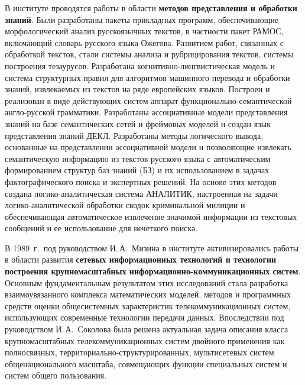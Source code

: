 \begin{multicols}{2}
     В институте проводятся работы в области \textbf{методов
представления и обработки знаний}. Были разработаны пакеты
прикладных программ, обеспечивающие морфологический анализ
русскоязычных текстов, в частности пакет РАМОС, включающий
словарь русского языка Ожегова. Развитием работ, связанных с
обработкой текстов, стали сис\-те\-мы анализа и рубрицирования
текстов, системы построения тезаурусов. Разработана
     ког\-ни\-тив\-но-линг\-ви\-сти\-че\-ская модель и система структурных
правил для алгоритмов машинного перевода и обработки знаний,
извлекаемых из текстов на ряде европейских языков. Построен и
реализован в виде действующих систем аппарат функ\-цио\-наль\-но-се\-ман\-ти\-че\-ской 
анг\-ло-рус\-ской грамматики. Разработаны
ассоциативные модели представления знаний на базе семантических
сетей и фреймовых моделей и создан язык представления знаний
ДЕКЛ. Разработаны методы логического вывода, основанные на
представлении ассоциативной модели и позволяющие извлекать
семантическую информацию из текстов русского языка с
автоматическим формированием структур баз знаний (БЗ) и их использованием в
задачах фактографического поиска и экспертных решений. На
основе этих методов создана ло\-ги\-ко-ана\-ли\-ти\-че\-ская система
\mbox{АНАЛИТИК}, настроенная на задачи ло\-ги\-ко-ана\-ли\-ти\-че\-ской
обработки сводок криминальной милиции и обеспечивающая
автоматическое извлечение значимой информации из текстовых
сообщений и ее использование для нечеткого поиска.
{

}

     В 1989~г.\ под руководством И.\,А.~Мизина в %
инсти\-ту\-те
активизировались работы в области %
разви\-тия \textbf{сетевых
информационных технологий и технологии построения
крупномасштабных ин\-фор\-ма\-ци\-он\-но-ком\-му\-ни\-ка\-ци\-он\-ных
систем}. Основным фундаментальным результатом этих
исследований стала разработка взаимоувязанного комплекса
математических моделей, методов и программных средств оценки
общесистемных характеристик телекоммуникационных систем,
использующих современные технологии передачи данных.
Впоследствии под руководством И.\,А.~Соколова была решена
актуальная задача описания класса крупномасштабных
телекоммуникационных систем двойного применения как
полносвязных, территориально-струк\-ту\-ри\-ро\-ван\-ных, мультисетевых
систем общенационального масштаба, совмещающих функции
специальных систем и систем общего пользования.


\end{multicols}
